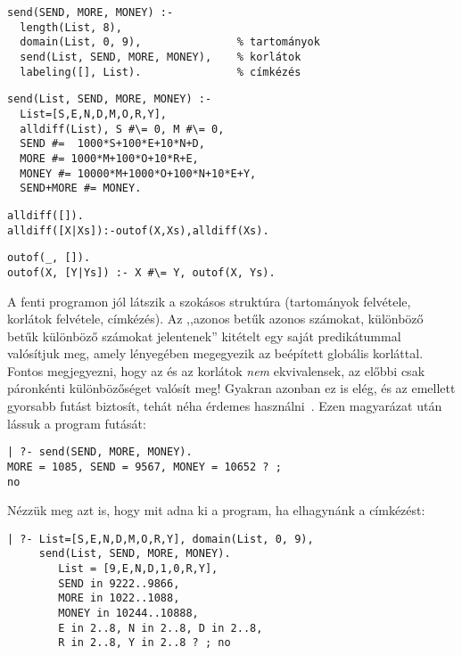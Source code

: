 \begin{verbatim}
send(SEND, MORE, MONEY) :-
  length(List, 8),
  domain(List, 0, 9),               % tartományok
  send(List, SEND, MORE, MONEY),    % korlátok
  labeling([], List).               % címkézés
\end{verbatim}
\begin{verbatim}
send(List, SEND, MORE, MONEY) :-
  List=[S,E,N,D,M,O,R,Y],
  alldiff(List), S #\= 0, M #\= 0,
  SEND #=  1000*S+100*E+10*N+D,
  MORE #= 1000*M+100*O+10*R+E,
  MONEY #= 10000*M+1000*O+100*N+10*E+Y,
  SEND+MORE #= MONEY.
\end{verbatim}
\begin{alltt}
% alldiff(L): L elemei mind különbözőek (buta megvalósítás).
% Lényegében azonos a beépített all_different/1 kombinatorikai globális korláttal.
alldiff([]).
alldiff([X|Xs]) :- outof(X, Xs), alldiff(Xs).
\end{alltt}
\begin{verbatim}
outof(_, []).
outof(X, [Y|Ys]) :- X #\= Y, outof(X, Ys).
\end{verbatim}

A fenti programon jól látszik a szokásos \clpfd struktúra (tartományok
felvétele, korlátok felvétele, címkézés). Az ,,azonos betűk azonos számokat,
különböző betűk különböző számokat jelentenek'' kitételt egy saját
 predikátummal valósítjuk meg, amely lényegében megegyezik
az  beépített globális korláttal. Fontos megjegyezni,
hogy az  és az  korlátok \emph{nem}
ekvivalensek, az előbbi csak páronkénti különbözőséget valósít meg! Gyakran
azonban ez is elég, és az  emellett gyorsabb futást biztosít,
tehát néha érdemes használni~\cite{DBLP:conf/aaai/Regin94}. Ezen magyarázat után lássuk a program futását:

\begin{verbatim}
| ?- send(SEND, MORE, MONEY).
MORE = 1085, SEND = 9567, MONEY = 10652 ? ;
no
\end{verbatim}

Nézzük meg azt is, hogy mit adna ki a program, ha elhagynánk a címkézést:

\begin{verbatim}
| ?- List=[S,E,N,D,M,O,R,Y], domain(List, 0, 9),
     send(List, SEND, MORE, MONEY).
        List = [9,E,N,D,1,0,R,Y],
        SEND in 9222..9866,
        MORE in 1022..1088,
        MONEY in 10244..10888,
        E in 2..8, N in 2..8, D in 2..8,
        R in 2..8, Y in 2..8 ? ; no
\end{verbatim}

